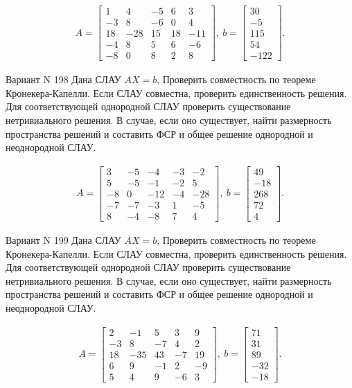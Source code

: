 \documentclass[11pt]{report}
\begin{document}
\begin{align*}
 A = \left[\begin{matrix}1 & 4 & -5 & 6 & 3\\-3 & 8 & -6 & 0 & 4\\18 & -28 & 15 & 18 & -11\\-4 & 8 & 5 & 6 & -6\\-8 & 0 & 8 & 2 & 8\end{matrix}\right],
\ b = \left[\begin{matrix}30\\-5\\115\\54\\-122\end{matrix}\right]. 
 \end{align*}

Вариант N 198
Дана СЛАУ $AX = b$,
Проверить совместность по теореме Кронекера-Капелли. Если СЛАУ совместна, проверить единственность решения.
Для соответствующей однородной СЛАУ проверить существование нетривиального решения. В случае, если оно существует,
найти размерность пространства решений и составить ФСР и общее решение однородной  и неоднородной СЛАУ.


\begin{align*}
 A = \left[\begin{matrix}3 & -5 & -4 & -3 & -2\\5 & -5 & -1 & -2 & 5\\-8 & 0 & -12 & -4 & -28\\-7 & -7 & -3 & 1 & -5\\8 & -4 & -8 & 7 & 4\end{matrix}\right],
\ b = \left[\begin{matrix}49\\-18\\268\\72\\4\end{matrix}\right]. 
 \end{align*}

Вариант N 199
Дана СЛАУ $AX = b$,
Проверить совместность по теореме Кронекера-Капелли. Если СЛАУ совместна, проверить единственность решения.
Для соответствующей однородной СЛАУ проверить существование нетривиального решения. В случае, если оно существует,
найти размерность пространства решений и составить ФСР и общее решение однородной  и неоднородной СЛАУ.


\begin{align*}
 A = \left[\begin{matrix}2 & -1 & 5 & 3 & 9\\-3 & 8 & -7 & 4 & 2\\18 & -35 & 43 & -7 & 19\\6 & 9 & -1 & 2 & -9\\5 & 4 & 9 & -6 & 3\end{matrix}\right],
\ b = \left[\begin{matrix}71\\31\\89\\-32\\-18\end{matrix}\right]. 
 \end{align*}
\end{document}
